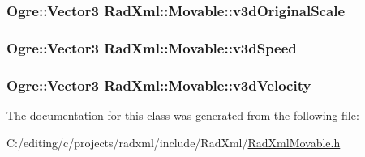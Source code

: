 \hypertarget{class_rad_xml_1_1_movable_ae8ce0442f6e574174bf8907109e2444d}{
\subsubsection[{v3d\-Original\-Scale}]{\setlength{\rightskip}{0pt plus 5cm}Ogre\-::\-Vector3 Rad\-Xml\-::\-Movable\-::v3d\-Original\-Scale\hspace{0.3cm}{\ttfamily [protected]}}}\label{class_rad_xml_1_1_movable_ae8ce0442f6e574174bf8907109e2444d}
\hypertarget{class_rad_xml_1_1_movable_a705a1bdbe95de19350ebf6771c70c3b2}{
\subsubsection[{v3d\-Speed}]{\setlength{\rightskip}{0pt plus 5cm}Ogre\-::\-Vector3 Rad\-Xml\-::\-Movable\-::v3d\-Speed\hspace{0.3cm}{\ttfamily [protected]}}}\label{class_rad_xml_1_1_movable_a705a1bdbe95de19350ebf6771c70c3b2}
\hypertarget{class_rad_xml_1_1_movable_a7ca94e1eff62de64de8bef98c839b51e}{
\subsubsection[{v3d\-Velocity}]{\setlength{\rightskip}{0pt plus 5cm}Ogre\-::\-Vector3 Rad\-Xml\-::\-Movable\-::v3d\-Velocity\hspace{0.3cm}{\ttfamily [protected]}}}\label{class_rad_xml_1_1_movable_a7ca94e1eff62de64de8bef98c839b51e}


The documentation for this class was generated from the following file\-:\begin{DoxyCompactItemize}
\item 
C\-:/editing/c/projects/radxml/include/\-Rad\-Xml/\hyperlink{_rad_xml_movable_8h}{Rad\-Xml\-Movable.\-h}\end{DoxyCompactItemize}
